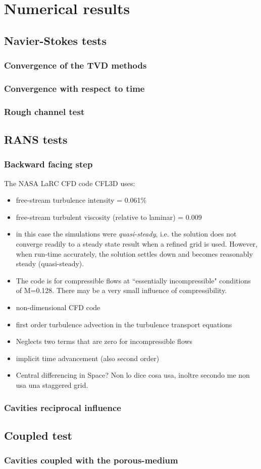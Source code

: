 \chapter{Numerical results} \label{chap:results}
\section{Navier-Stokes tests}
\subsection{Convergence of the TVD methods}
\subsection{Convergence with respect to time}
\subsection{Rough channel test}
\section{RANS tests}
\subsection{Backward facing step}
The NASA LaRC CFD code CFL3D uses:
\begin{itemize}
	\item free-stream turbulence intensity = 0.061\%
	\item free-stream turbulent viscosity (relative to laminar) = 0.009
	\item in this case the simulations were \emph{quasi-steady}, i.e. the 
	solution does not converge readily to a steady state result when a refined 
	grid is used. However, when run-time accurately, the solution settles down 
	and becomes reasonably steady (quasi-steady).
	\item The code is for compressible flows at ``essentially incompressible" 
	conditions of M=0.128. There may be a very small influence of 
	compressibility.
	\item non-dimensional CFD code
	\item first order turbulence advection in the turbulence transport equations
	\item Neglects two terms that are zero for incompressible flows
	\item implicit time advancement (also second order)
	\item Central differencing in Space? Non lo dice cosa usa, inoltre secondo 
	me non usa una staggered grid.
\end{itemize}
\subsection{Cavities reciprocal influence}
\section{Coupled test}
\subsection{Cavities coupled with the porous-medium}
